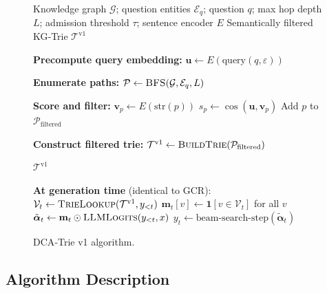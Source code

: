 \begin{figure}[H]
  \centering
  \begin{algorithm}[H]
    \caption{DCA‑Trie v1: Static Semantic Filtering at Construction Time}
    \label{alg:v1}
    \begin{algorithmic}[1]
      \Require Knowledge graph $\mathcal{G}$; question entities $\mathcal{E}_q$;
      question $q$; max hop depth $L$; admission threshold $\tau$;
      sentence encoder $E$
      \Ensure Semantically filtered KG‑Trie $\mathcal{T}^{\text{v1}}$

      \State \textbf{Precompute query embedding:}
      $\mathbf{u} \gets E(\text{query}(q, \varepsilon))$

      \State \textbf{Enumerate paths:}
      $\mathcal{P} \gets \textsc{BFS}(\mathcal{G}, \mathcal{E}_q, L)$

      \State \textbf{Score and filter:}
      \State $\mathbf{v}_p \gets E(\text{str}(p))$
      \State $s_p \gets \cos(\mathbf{u}, \mathbf{v}_p)$
      \State Add $p$ to $\mathcal{P}_{\text{filtered}}$
      \EndIf
      \EndFor

      \State \textbf{Construct filtered trie:}
      $\mathcal{T}^{\text{v1}} \gets \textsc{BuildTrie}(\mathcal{P}_{\text{filtered}})$

      \State \Return $\mathcal{T}^{\text{v1}}$

      \Statex
      \Statex \textbf{At generation time} (identical to GCR):
      \State $\mathcal{V}_t \gets \textsc{TrieLookup}(\mathcal{T}^{\text{v1}}, y_{<t})$
      \State $\mathbf{m}_t[v] \gets \mathbf{1}[v \in \mathcal{V}_t]$ for all $v$
      \State $\tilde{\boldsymbol{\alpha}}_t \gets \mathbf{m}_t \odot
        \textsc{LLMLogits}(y_{<t}, x)$
      \State $y_t \gets \text{beam-search-step}(\tilde{\boldsymbol{\alpha}}_t)$
      \EndFor
    \end{algorithmic}
  \end{algorithm}
  \caption[Algorithm for DCA‑Trie v1]{DCA‑Trie v1 algorithm.}
  \label{fig:alg:v1}
\end{figure}

\subsection{Algorithm Description}


